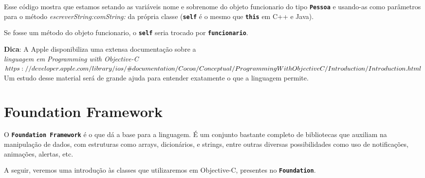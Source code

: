 \documentclass[a4paper,12pt,brazil,oneside]{book}
\begin{document}
Esse código mostra que estamos setando as variáveis nome e sobrenome do objeto funcionario do tipo \texttt{\textbf{Pessoa}} e usando-as como parâmetros para o método \emph{escreverString:comString:} da própria classe (\texttt{\textbf{self}} é o mesmo que \texttt{\textbf{this}} em C++ e Java).

Se fosse um método do objeto funcionario, o \texttt{\textbf{self}} seria trocado por \texttt{\textbf{funcionario}}.

\begin{framed}

\textbf{Dica}: A Apple disponibiliza uma extensa documentação sobre a \textit{\\linguagem em Programming with Objective-C\\ \(https://developer.apple.com/library/ios/\#documentation/Cocoa/Conceptual/\\ProgrammingWithObjectiveC/Introduction/Introduction.html \)\\}
Um estudo desse material será de grande ajuda para entender exatamente o que a linguagem permite.
\end{framed}

\section{Foundation Framework}


O \texttt{\textbf{Foundation Framework}} é o que dá a base para a linguagem. É um conjunto bastante completo de bibliotecas que auxiliam na manipulação de dados, com estruturas como arrays, dicionários, e strings, entre outras diversas possibilidades como uso de notificações, animações, alertas, etc.

A seguir, veremos uma introdução às classes que utilizaremos em Objective-C, presentes no \texttt{\textbf{Foundation}}.
\end{document}
